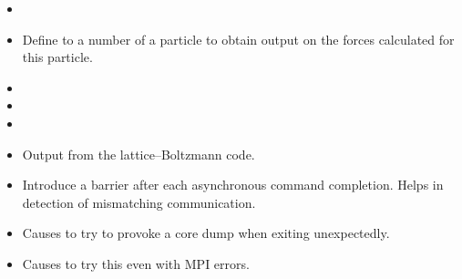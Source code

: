 \begin{itemize}
\item {}
\item {} Define to a number of a particle to
  obtain output on the forces calculated for this particle.
\item {}
\item {}
\item {}
\item {} Output from the lattice--Boltzmann code.
\item {} Introduce a barrier after each
  asynchronous command completion. Helps in detection of mismatching
  communication.
\item {} Causes \es{} to try to provoke a core dump
  when exiting unexpectedly.
\item {} Causes \es{} to try this even with MPI errors.
\end{itemize}

